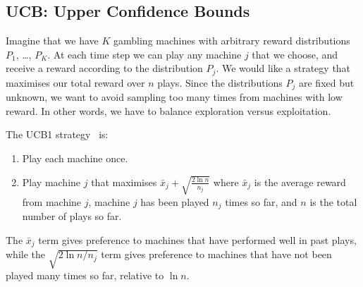 \documentclass[12pt,amstags,fleqn]{article}
\theoremstyle{plain}
\theoremstyle{definition}
\theoremstyle{definition}
\begin{document}
\subsection{UCB: Upper Confidence Bounds}

Imagine that we have $K$ gambling machines with arbitrary reward
distributions $P_1$, \dots, $P_K$. At each time step we can play
any machine $j$ that we choose, and receive a reward according to
the distribution $P_j$. We would like a strategy that maximises our
total reward over $n$ plays. Since the distributions $P_j$ are fixed
but unknown, we want to avoid sampling too many times from machines
with low reward. In other words, we have to balance exploration versus exploitation.

The UCB1 strategy~\cite{Auer:2002} is:

\begin{enumerate}

\item Play each machine once.

\item Play machine $j$ that maximises $\bar x_j + \sqrt{\frac{2 \ln n}{n_j}}$ where $\bar x_j$ is the average reward from machine $j$, machine $j$ has been played $n_j$ times so far, and $n$ is the total number of plays so far.
\end{enumerate}

The $\bar x_j$ term gives preference to machines that have performed well in
past plays, while the $\sqrt{{2 \ln n}/{n_j}}$ term gives preference
to machines that have not been played many times so far, relative to
$\ln n$.
\end{document}
